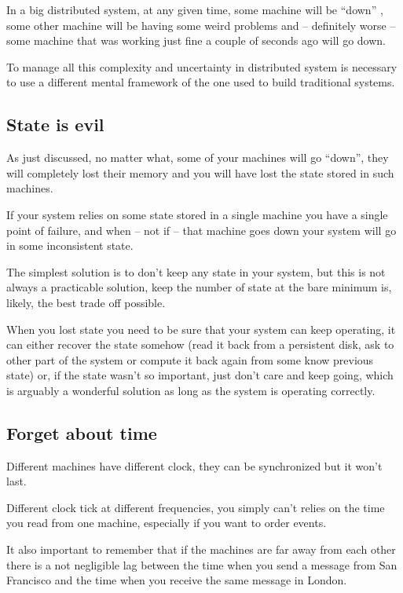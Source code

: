 \documentclass[12pt]{article} %
\begin{document}
In a big distributed system, at any given time, some machine will be ``down'' , some other machine will be having some weird problems and -- definitely worse -- some machine that was working just fine a couple of seconds ago will go down.

To manage all this complexity and uncertainty in distributed system is necessary to use a different mental framework of the one used to build traditional systems.

	\subsection{State is evil}
	
As just discussed, no matter what, some of your machines will go ``down'', they will completely lost their memory and you will have lost the state stored in such machines.

If your system relies on some state stored in a single machine you have a single point of failure, and when -- not if -- that machine goes down your system will go in some inconsistent state.

The simplest solution is to don't keep any state in your system, but this is not always a practicable solution, keep the number of state at the bare minimum is, likely, the best trade off possible.

When you lost state you need to be sure that your system can keep operating, it can either recover the state somehow (read it back from a persistent disk, ask to other part of the system or compute it back again from some know previous state) or, if the state wasn't so important, just don't care and keep going, which is arguably a wonderful solution as long as the system is operating correctly.

	\subsection{Forget about time}
	
Different machines have different clock, they can be synchronized but it won't last.

Different clock tick at different frequencies, you simply can't relies on the time you read from one machine, especially if you want to order events.

It also important to remember that if the machines are far away from each other there is a not negligible lag between the time when you send a message from San Francisco and the time when you receive the same message in London. 
\end{document}
